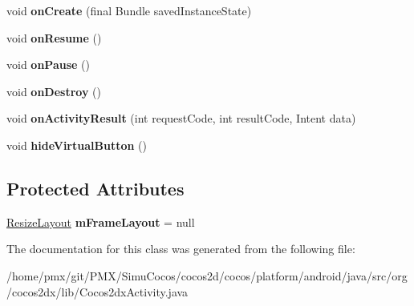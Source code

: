 \begin{DoxyCompactItemize}
\mbox{\label{classorg_1_1cocos2dx_1_1lib_1_1Cocos2dxActivity_a2717d252ff4066bf18d523baf3869cdc}} 
void {\bfseries on\+Create} (final Bundle saved\+Instance\+State)
\item 
\mbox{\label{classorg_1_1cocos2dx_1_1lib_1_1Cocos2dxActivity_a2dbb2d099fc3dfac9e5bee203d7eb5bc}} 
void {\bfseries on\+Resume} ()
\item 
\mbox{\label{classorg_1_1cocos2dx_1_1lib_1_1Cocos2dxActivity_adb64b0420c6db4e275aaae153d74d1c6}} 
void {\bfseries on\+Pause} ()
\item 
\mbox{\label{classorg_1_1cocos2dx_1_1lib_1_1Cocos2dxActivity_a2c1ffa79926ebd7fe5e2cde1ae92eed0}} 
void {\bfseries on\+Destroy} ()
\item 
\mbox{\label{classorg_1_1cocos2dx_1_1lib_1_1Cocos2dxActivity_a209050201964c75ddf004e30f1b6b063}} 
void {\bfseries on\+Activity\+Result} (int request\+Code, int result\+Code, Intent data)
\item 
\mbox{\label{classorg_1_1cocos2dx_1_1lib_1_1Cocos2dxActivity_a0a97c30f1171cff3ff39c1968bda2229}} 
void {\bfseries hide\+Virtual\+Button} ()
\end{DoxyCompactItemize}
\subsection*{Protected Attributes}
\begin{DoxyCompactItemize}
\item 
\mbox{\label{classorg_1_1cocos2dx_1_1lib_1_1Cocos2dxActivity_a46689d49e4903412f0a5c680f6fb2bc9}} 
\hyperlink{classorg_1_1cocos2dx_1_1lib_1_1ResizeLayout}{Resize\+Layout} {\bfseries m\+Frame\+Layout} = null
\end{DoxyCompactItemize}


The documentation for this class was generated from the following file\+:\begin{DoxyCompactItemize}
\item 
/home/pmx/git/\+P\+M\+X/\+Simu\+Cocos/cocos2d/cocos/platform/android/java/src/org/cocos2dx/lib/Cocos2dx\+Activity.\+java\end{DoxyCompactItemize}
